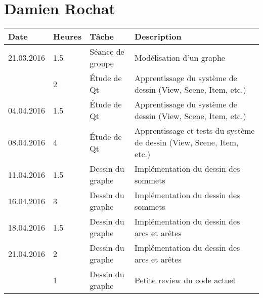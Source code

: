 \documentclass[french]{article}
\begin{document}
	\section*{Damien Rochat}
	\begin{tabular}{p{}|p{}|p{}|p{}}
		Date & Heures & Tâche & Description \\
		\hline \hline
		21.03.2016 & 1.5 & Séance de groupe & Modélisation d'un graphe \\	
		           & 2 & Étude de Qt & Apprentissage du système de dessin (View, Scene, Item, etc.) \\
		\hline
		04.04.2016 & 1.5 & Étude de Qt & Apprentissage du système de dessin (View, Scene, Item, etc.) \\
		\hline
		08.04.2016 & 4 & Étude de Qt & Apprentissage et tests du système de dessin (View, Scene, Item, etc.) \\
		\hline
		11.04.2016 & 1.5 & Dessin du graphe & Implémentation du dessin des sommets \\
		\hline
		16.04.2016 & 3 & Dessin du graphe & Implémentation du dessin des sommets \\
		\hline
		18.04.2016 & 1.5 & Dessin du graphe & Implémentation du dessin des arcs et arêtes \\
		\hline
		21.04.2016 & 2 & Dessin du graphe & Implémentation du dessin des arcs et arêtes \\
		           & 1 & Dessin du graphe & Petite review du code actuel \\


\end{tabular}
\end{document}
